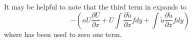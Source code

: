 It may be helpful to note that the third term in  expands to
\begin{equation}\label{eq:3rd}
- (n U  \frac{\partial U}{\partial x} + U \int \frac{\partial \tilde{u}}{\partial x} f dy+    \int \tilde{u} \frac{\partial \tilde{u}}{\partial x} f dy)
\end{equation}
where   has been used to zero one term.

%
